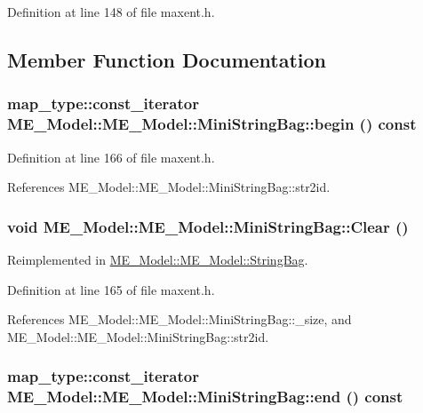 Definition at line 148 of file maxent.h.

\subsection{Member Function Documentation}
\hypertarget{structME__Model_1_1MiniStringBag_f5f835816a42486039673465a9673dde}{
\subsubsection[{begin}]{\setlength{\rightskip}{0pt plus 5cm}map\_\-type::const\_\-iterator ME\_\-Model::ME\_\-Model::MiniStringBag::begin () const}}
\label{structME__Model_1_1MiniStringBag_f5f835816a42486039673465a9673dde}




Definition at line 166 of file maxent.h.

References ME\_\-Model::ME\_\-Model::MiniStringBag::str2id.\hypertarget{structME__Model_1_1MiniStringBag_8e33bf101509ddad253cd10a781474dd}{
\subsubsection[{Clear}]{\setlength{\rightskip}{0pt plus 5cm}void ME\_\-Model::ME\_\-Model::MiniStringBag::Clear ()}}
\label{structME__Model_1_1MiniStringBag_8e33bf101509ddad253cd10a781474dd}




Reimplemented in \hyperlink{structME__Model_1_1StringBag_ce3d97f271ebaa31f4f09399b2c618db}{ME\_\-Model::ME\_\-Model::StringBag}.

Definition at line 165 of file maxent.h.

References ME\_\-Model::ME\_\-Model::MiniStringBag::\_\-size, and ME\_\-Model::ME\_\-Model::MiniStringBag::str2id.\hypertarget{structME__Model_1_1MiniStringBag_e4a3cd6f62c486989707ab465ef4a6a8}{
\subsubsection[{end}]{\setlength{\rightskip}{0pt plus 5cm}map\_\-type::const\_\-iterator ME\_\-Model::ME\_\-Model::MiniStringBag::end () const}}
\label{structME__Model_1_1MiniStringBag_e4a3cd6f62c486989707ab465ef4a6a8}




